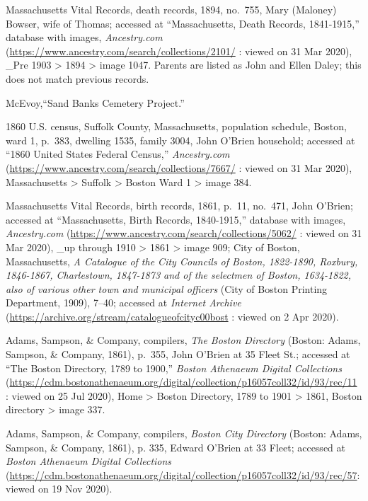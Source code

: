 \begin{thebibliography}{999}
Massachusetts Vital Records, death records, 1894, no.\ 755, Mary (Maloney) Bowser, wife of Thomas; accessed at ``Massachusetts, Death Records, 1841-1915,'' database with images, \textit{Ancestry.com} (\url{https://www.ancestry.com/search/collections/2101/} : viewed on 31 Mar 2020), \_Pre 1903 > 1894 > image 1047. Parents are listed as John and Ellen Daley; this does not match previous records.

McEvoy,``Sand Banks Cemetery Project.''

1860 U.S. census, Suffolk County, Massachusetts, population schedule, Boston, ward 1, p.\ 383, dwelling 1535, family 3004, John O'Brien household; accessed at ``1860 United States Federal Census,'' \textit{Ancestry.com} (\url{https://www.ancestry.com/search/collections/7667/} : viewed on 31 Mar 2020), Massachusetts > Suffolk > Boston Ward 1 > image 384.

Massachusetts Vital Records, birth records, 1861, p.\ 11, no.\ 471, John O'Brien; accessed at ``Massachusetts, Birth Records, 1840-1915,'' database with images, \textit{Ancestry.com} (\url{https://www.ancestry.com/search/collections/5062/} : viewed on 31 Mar 2020), \_up through 1910 > 1861 > image 909; City of Boston, Massachusetts, \textit{A Catalogue of the City Councils of Boston, 1822-1890, Roxbury, 1846-1867, Charlestown, 1847-1873 and of the selectmen of Boston, 1634-1822, also of various other town and municipal officers} (City of Boston Printing Department, 1909), 7--40; accessed at \textit{Internet Archive} (\url{https://archive.org/stream/catalogueofcityc00bost} : viewed on 2 Apr 2020).

Adams, Sampson, \& Company, compilers, \textit{The Boston Directory} (Boston: Adams, Sampson, \& Company, 1861), p.\ 355, John O'Brien at 35 Fleet St.; accessed at ``The Boston Directory, 1789 to 1900,'' \textit{Boston Athenaeum Digital Collections} (\url{https://cdm.bostonathenaeum.org/digital/collection/p16057coll32/id/93/rec/11} : viewed on 25 Jul 2020), Home > Boston Directory, 1789 to 1901 > 1861, Boston directory > image 337.

Adams, Sampson, \& Company, compilers, \textit{Boston City Directory} (Boston: Adams, Sampson, \& Company, 1861), p. 335, Edward O'Brien at 33 Fleet; accessed at \textit{Boston Athenaeum Digital Collections} (\url{https://cdm.bostonathenaeum.org/digital/collection/p16057coll32/id/93/rec/57}: viewed on 19 Nov 2020).


\end{thebibliography}
